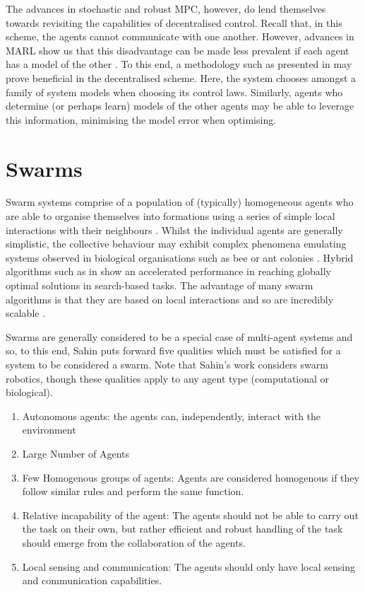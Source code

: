 \documentclass[.../main.tex]{subfiles}
\begin{document}
The advances in stochastic and robust MPC, however, do lend themselves towards revisiting the
capabilities of decentralised control. Recall that, in this scheme, the agents cannot communicate
with one another. However, advances in MARL show us that this disadvantage can be made less
prevalent if each agent has a model of the other \cite{Foerster}. To this end, a methodology such as
presented in \cite{Heirung2019} may prove beneficial in the decentralised scheme. Here, the system
chooses amongst a family of system models when choosing its control laws. Similarly, agents who
determine (or perhaps learn) models of the other agents may be able to leverage this information,
minimising the model error when optimising.


\section{Swarms} \label{sec::Swarms}

Swarm systems comprise of a population of (typically) homogeneous
agents who are able to organise themselves into formations using a
series of simple local interactions with their neighbours
\cite{Couceiro2015}. Whilst the individual agents are generally
simplistic, the collective behaviour may exhibit complex phenomena
emulating systems observed in biological organisations such as bee or
ant colonies \cite{Sethi2017}. Hybrid algorithms such as in
\cite{Gao2018} show an accelerated performance in reaching globally
optimal solutions in search-based tasks. The advantage of many swarm
algorithms is that they are based on local interactions and so are
incredibly scalable \cite{Rizk2018}. 

Swarms are generally considered to be a special case of multi-agent systems and so, to this end,
Sahin \cite{Sahin2005} puts forward five qualities which must be satisfied for a system to be
considered a swarm. Note that Sahin's work considers swarm robotics, though these qualities apply to
any agent type (computational or biological).

\begin{enumerate}
    \item Autonomous agents: the agents can, independently, interact with the environment
    \item Large Number of Agents
    \item Few Homogenous groups of agents: Agents are considered homogenous if they follow similar
    rules and perform the same function.
    \item Relative incapability of the agent: The agents should not be able to carry out the task on
    their own, but rather efficient and robust handling of the task should emerge from the
    collaboration of the agents.
    \item Local sensing and communication: The agents should only have local sensing and
    communication capabilities.
\end{enumerate}
\end{document}

